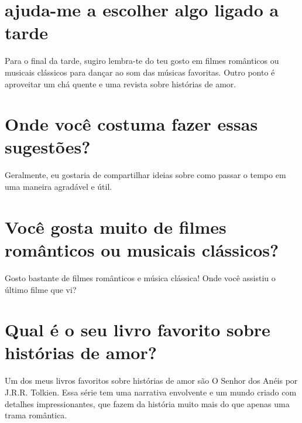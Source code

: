 \documentclass[11pt,a4paper]{article}
\begin{document}
\section{ajuda-me a escolher algo ligado a tarde}
Para o final da tarde, sugiro lembra-te do teu gosto em filmes românticos ou musicais clássicos para dançar ao som das músicas favoritas. Outro ponto é aproveitar um chá quente e uma revista sobre histórias de amor.

\section{Onde você costuma fazer essas sugestões?}
Geralmente, eu gostaria de compartilhar ideias sobre como passar o tempo em uma maneira agradável e útil.

\section{Você gosta muito de filmes românticos ou musicais clássicos?}
Gosto bastante de filmes românticos e música clássica! Onde você assistiu o último filme que vi?

\section{Qual é o seu livro favorito sobre histórias de amor?}
Um dos meus livros favoritos sobre histórias de amor são O Senhor dos Anéis por J.R.R. Tolkien. Essa série tem uma narrativa envolvente e um mundo criado com detalhes impressionantes, que fazem da história muito mais do que apenas uma trama romântica.
\end{document}
